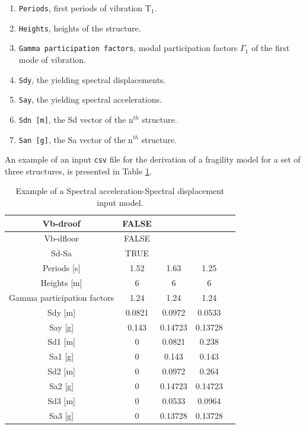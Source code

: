 \begin{enumerate}
\item \verb=Periods=, first periods of vibration T$_1$.
\item \verb=Heights=, heights of the structure.
\item \verb=Gamma participation factors=, modal participation factors $\Gamma_1$ of the first mode of vibration.
\item \verb=Sdy=, the yielding spectral displacements.
\item \verb=Say=, the yielding spectral accelerations.
\item \verb=Sdn [m]=, the Sd vector of the n$^{th}$ structure.
\item \verb=San [g]=, the Sa vector of the n$^{th}$ structure. \\
\end{enumerate}

An example of an input \verb=csv= file for the derivation of a fragility model for a set of three structures, is presented in Table \ref{table:Vb-dfloor_input}.

\begin {table}[htb]
\caption{Example of a Spectral acceleration-Spectral displacement input model.}
\label{table:Vb-dfloor_input}
\begin{center}
  \begin{tabular}{ | c | c | c | c | c |}
  \hline
	Vb-droof &	FALSE & &  \\ \hline
	Vb-dfloor & 	FALSE & & \\ \hline
	Sd-Sa &	TRUE & & \\ \hline
	Periods [s] &	1.52 &	1.63 &	1.25 \\ \hline
	Heights [m]	& 6 &	6	& 6 \\ \hline
	Gamma participation factors	& 1.24 &	1.24 &	1.24 \\ \hline
	Sdy [m] & 	0.0821 & 	0.0972 &	0.0533\\ \hline
	Say [g]	& 0.143	& 0.14723	& 0.13728 \\ \hline
	Sd1 [m]	& 0 &	0.0821	& 0.238 \\ \hline
	Sa1 [g]	& 0	& 0.143	& 0.143 \\ \hline
	Sd2 [m] &	0 & 0.0972	& 0.264 \\ \hline
	Sa2 [g]	& 0	& 0.14723	& 0.14723 \\ \hline
	Sd3 [m]	& 0	& 0.0533	& 0.0964 \\ \hline
	Sa3 [g]	& 0	& 0.13728	& 0.13728 \\ \hline
  \end{tabular}
\end{center}
\end{table}